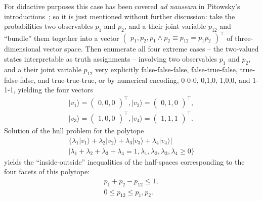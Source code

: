 For didactive purposes this case has been covered {\em ad nauseam} in Pitowsky's introductions~\cite{pitowsky-86,pitowsky,pitowsky-89a,Pit-91,Pit-94,2000-poly};
so it is just mentioned without further discussion:
take the probabilities two observables $p_1$ and $p_2$, and a their joint variable $p_{12}$
and ``bundle'' them together into  a vector
$\begin{pmatrix} p_1, p_2, p_1\wedge p_2 \equiv p_{12}=p_1p_2\end{pmatrix}^\intercal$
of three-dimensional vector space.
Then enumerate all
four extreme cases -- the two-valued states interpretable as truth assignments --
involving two observables $p_1$ and $p_2$, and a their joint variable $p_{12}$
very explicitly false-false-false,  false-true-false, true-false-false, and true-true-true,
or by numerical encoding, 0-0-0, 0,1,0, 1,0,0, and 1-1-1,
yielding the four vectors
\begin{equation}
\begin{split}
\vert v_1 \rangle = \begin{pmatrix} 0, 0, 0\end{pmatrix}^\intercal,
\vert v_2 \rangle =\begin{pmatrix} 0, 1, 0\end{pmatrix}^\intercal,    \\
\vert v_3 \rangle =\begin{pmatrix} 1, 0, 0\end{pmatrix}^\intercal,
\vert v_4 \rangle =\begin{pmatrix} 1, 1, 1\end{pmatrix}^\intercal.
\label{2017-b-t-2-jpv}
\end{split}
\end{equation}
Solution of the hull problem for the polytope
\begin{equation}
\begin{split}
  \Big\{
\lambda_1 \vert v_1 \rangle  +
\lambda_2 \vert v_2 \rangle  +
\lambda_3 \vert v_3 \rangle  +
\lambda_4 \vert v_4 \rangle  \Big|    \qquad
\\  \Big|
\lambda_1    +
\lambda_2    +
\lambda_3    +
\lambda_4  =1,
\lambda_1,
\lambda_2,
\lambda_3,
\lambda_4\ge 0
\Big\}
\label{2017-b-t-2-jpcp}
\end{split}
\end{equation}
yields the ``inside-outside'' inequalities of the half-spaces corresponding to the four facets of this polytope:
\begin{equation}
\begin{split}
p_1 + p_2 - p_{12}  \le  1,  \\
0\le p_{12}  \le  p_1 ,  p_2
.
\end{split}
\label{2017-b-1-2-p-c}
\end{equation}

